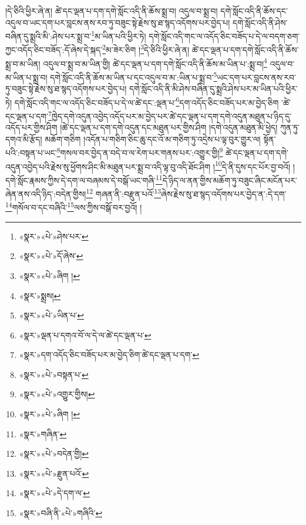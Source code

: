 །དེ་ཅིའི་ཕྱིར་ཞེ་ན། ཚེ་དང་ལྡན་པ་དག་དགེ་སློང་འདི་ནི་ཆོས་སྨྲ་བ། འདུལ་བ་སྨྲ་བ། དགེ་སློང་འདི་ནི་ཆོས་དང་འདུལ་བ་ཡང་དག་པར་བླངས་ནས་རབ་ཏུ་བཟུང་སྟེ་རྗེས་སུ་ཐ་སྙད་འདོགས་པར་བྱེད་པ། དགེ་སློང་འདི་ནི་ཤེས་བཞིན་དུ་སྨྲའི་མི་:ཤེས་པར་སྨྲ་བ་\footnote{«སྣར་»«པེ་»ཤེས་པར་}མ་ཡིན་པའི་ཕྱིར་ཏེ། དགེ་སློང་འདི་གང་ལ་འདོད་ཅིང་བཟོད་པ་དེ་ལ་བདག་ཅག་ཀྱང་འདོད་ཅིང་བཟོད་:དོ་ཞེས་དེ་སྐད་\footnote{«སྣར་»«པེ་»དོ་ཞེས་}མ་ཟེར་ཅིག །\footnote{«སྣར་»«པེ་»ཞིག །}དེ་ཅིའི་ཕྱིར་ཞེ་ན། ཚེ་དང་ལྡན་པ་དག་དགེ་སློང་འདི་ནི་ཆོས་སྨྲ་བ་མ་ཡིན། འདུལ་བ་སྨྲ་བ་མ་ཡིན་གྱི། ཚེ་དང་ལྡན་པ་དག་དགེ་སློང་འདི་ནི་ཆོས་མ་ཡིན་པ་:སྨྲ་བ།\footnote{«སྣར་»སྨྲས།} འདུལ་བ་མ་ཡིན་པ་སྨྲ་བ། དགེ་སློང་འདི་ནི་ཆོས་མ་ཡིན་པ་དང་འདུལ་བ་མ་:ཡིན་པ་སྨྲ་བ་\footnote{«སྣར་»«པེ་»ཡིན་པ་}ཡང་དག་པར་བླངས་ནས་རབ་ཏུ་བཟུང་སྟེ་རྗེས་སུ་ཐ་སྙད་འདོགས་པར་བྱེད་པ། དགེ་སློང་འདི་ནི་མི་ཤེས་བཞིན་དུ་སྨྲའི་ཤེས་པར་མ་ཡིན་པའི་ཕྱིར་ཏེ། དགེ་སློང་འདི་གང་ལ་འདོད་ཅིང་བཟོད་པ་དེ་ལ་ཚེ་དང་:ལྡན་པ་\footnote{«སྣར་»ལྡན་པ་དགའ་བོ་ལ་དེ་ལ་ཚེ་དང་ལྡན་པ་}དག་འདོད་ཅིང་བཟོད་པར་མ་བྱེད་ཅིག ་ཚེ་དང་ལྡན་པ་དག་\footnote{«སྣར་»དག་འདོད་ཅིང་བཟོད་པར་མ་བྱེད་ཅིག་ཚེ་དང་ལྡན་པ་དག་}ཁྱེད་དགེ་འདུན་འབྱེད་འདོད་པར་མ་བྱེད་པར་ཚེ་དང་ལྡན་པ་དག་དགེ་འདུན་མཐུན་པ་ཉིད་དུ་འདོད་པར་གྱིས་ཤིག །ཚེ་དང་ལྡན་པ་དག་དགེ་འདུན་དང་མཐུན་པར་གྱིས་ཤིག །དགེ་འདུན་མཐུན་མི་ཕྱེད། ཀུན་ཏུ་དགའ་མི་རྩོད། མཆོག་གཅིག །འདོན་པ་གཅིག་ཅིང་ཆུ་དང་འོ་མ་གཅིག་ཏུ་འདྲེས་པ་ལྟ་བུར་གྱུར་ལ། སྟོན་པའི་:བསྟན་པ་ཡང་\footnote{«སྣར་»«པེ་»བསྟན་པ་}གསལ་བར་བྱེད་ན་བདེ་བ་ལ་རེག་པར་གནས་པར་:འགྱུར་གྱི།\footnote{«སྣར་»«པེ་»འགྱུར་གྱིས།} ཚེ་དང་ལྡན་པ་དག་དགེ་འདུན་འབྱེད་པའི་རྗེས་སུ་ཕྱོགས་ཤིང་མི་མཐུན་པར་སྨྲ་བ་འདི་ལྟ་བུ་འདི་ཐོང་ཤིག །\footnote{«སྣར་»«པེ་»ཞིག །}དེ་ནི་དུས་དང་པོར་བྱ་བའོ། །དགེ་སློང་རྣམས་ཀྱིས་དེ་དག་ལ་བཞམས་དེ་བསྒོ་ཡང་གཞི་\footnote{«སྣར་»གཞིན་}དེ་ཉིད་ལ་ནན་གྱིས་མཆོག་ཏུ་བཟུང་ཞིང་མངོན་པར་ཞེན་ནས་འདི་ཉིད་:བདེན་གྱིས།\footnote{«སྣར་»«པེ་»བདེན་གྱི།} གཞན་ནི་:བརྫུན་པའོ་\footnote{«སྣར་»«པེ་»རྫུན་པའོ་}ཞེས་རྗེས་སུ་ཐ་སྙད་འདོགས་པར་བྱེད་ན་:དེ་དག་\footnote{«སྣར་»«པེ་»དེ་དག་ལ་}གསོལ་བ་དང་བཞིའི་\footnote{«སྣར་»བཞི་ནི་«པེ་»གཞིའི་}ལས་ཀྱིས་བསྒོ་བར་བྱའོ། །

